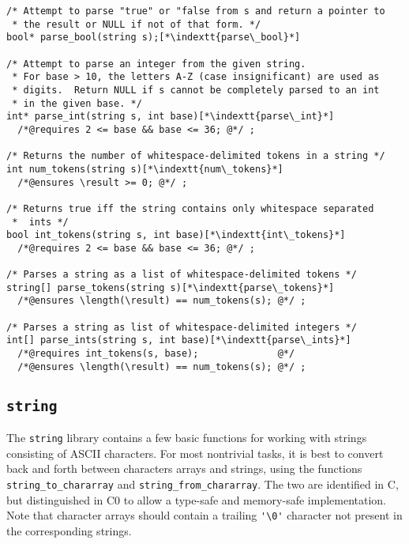 \documentclass[11pt]{article}
\makeatletter
\newcommand{\indextt}[1]{\index{#1@\texttt{#1}}}
\makeatother
\begin{document}
\begin{lstlisting}
/* Attempt to parse "true" or "false from s and return a pointer to
 * the result or NULL if not of that form. */
bool* parse_bool(string s);[*\indextt{parse\_bool}*]

/* Attempt to parse an integer from the given string.
 * For base > 10, the letters A-Z (case insignificant) are used as
 * digits.  Return NULL if s cannot be completely parsed to an int
 * in the given base. */
int* parse_int(string s, int base)[*\indextt{parse\_int}*]
  /*@requires 2 <= base && base <= 36; @*/ ;

/* Returns the number of whitespace-delimited tokens in a string */
int num_tokens(string s)[*\indextt{num\_tokens}*]
  /*@ensures \result >= 0; @*/ ;

/* Returns true iff the string contains only whitespace separated
 *  ints */
bool int_tokens(string s, int base)[*\indextt{int\_tokens}*]
  /*@requires 2 <= base && base <= 36; @*/ ;

/* Parses a string as a list of whitespace-delimited tokens */
string[] parse_tokens(string s)[*\indextt{parse\_tokens}*]
  /*@ensures \length(\result) == num_tokens(s); @*/ ;

/* Parses a string as list of whitespace-delimited integers */
int[] parse_ints(string s, int base)[*\indextt{parse\_ints}*]
  /*@requires int_tokens(s, base);              @*/
  /*@ensures \length(\result) == num_tokens(s); @*/ ;
\end{lstlisting}

\clearpage
\subsection{\tt string}

The \lstinline'string' library contains a few basic functions for working
with strings consisting of ASCII characters.  For most nontrivial
tasks, it is best to convert back and forth between characters arrays
and strings, using the functions \lstinline'string_to_chararray' and
\lstinline'string_from_chararray'.  The two are identified in C,
but distinguished in C0 to allow a type-safe and memory-safe
implementation.  Note that character arrays should contain a trailing
\lstinline"'\0'" character not present in the corresponding strings.
\end{document}
